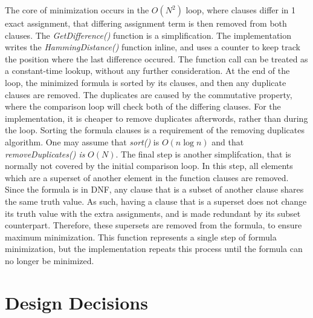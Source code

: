 \documentclass[english]{article}
\begin{document}
The core of minimization occurs in the $O(N^{2})$ loop, where clauses
differ in 1 exact assignment, that differing assignment term is then
removed from both clauses. The \emph{GetDifference()} function is
a simplification. The implementation writes the \emph{HammingDistance()}
function inline, and uses a counter to keep track the position where
the last difference occured. The function call can be treated as a
constant-time lookup, without any further consideration. At the end
of the loop, the minimized formula is sorted by its clauses, and then
any duplicate clauses are removed. The duplicates are caused by the
commutative property, where the comparison loop will check both of
the differing clauses. For the implementation, it is cheaper to remove
duplicates afterwords, rather than during the loop. Sorting the formula
clauses is a requirement of the removing duplicates algorithm. One
may assume that \emph{sort() }is $O(n\log n)$ and that \emph{removeDuplicates()
is }$O(N)$. The final step is another simplifcation, that is normally
not covered by the initial comparison loop. In this step, all elements
which are a superset of another element in the function clauses are
removed. Since the formula is in DNF, any clause that is a subset
of another clause shares the same truth value. As such, having a clause
that is a superset does not change its truth value with the extra
assignments, and is made redundant by its subset counterpart. Therefore,
these supersets are removed from the formula, to ensure maximum minimization.
This function represents a single step of formula minimization, but
the implementation repeats this process until the formula can no longer
be minimized.\emph{ }

\section{Design Decisions}
\end{document}
